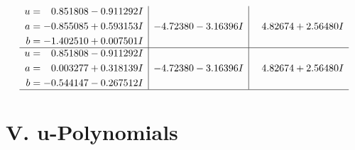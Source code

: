 \documentclass[1p]{elsarticle_modified}
\theoremstyle{definition}
\begin{document}
$$\begin{array}{c|c|c}
\begin{aligned}
u &= \phantom{-}0.851808 - 0.911292 I \\
a &= -0.855085 + 0.593153 I \\
b &= -1.402510 + 0.007501 I\end{aligned}
 & -4.72380 - 3.16396 I & \phantom{-}4.82674 + 2.56480 I \\ \hline\begin{aligned}
u &= \phantom{-}0.851808 - 0.911292 I \\
a &= \phantom{-}0.003277 + 0.318139 I \\
b &= -0.544147 - 0.267512 I\end{aligned}
 & -4.72380 - 3.16396 I & \phantom{-}4.82674 + 2.56480 I\\
 \hline 
 \end{array}$$\newpage
\newpage\renewcommand{\arraystretch}{1}
\centering \section*{ V. u-Polynomials}
\end{document}
